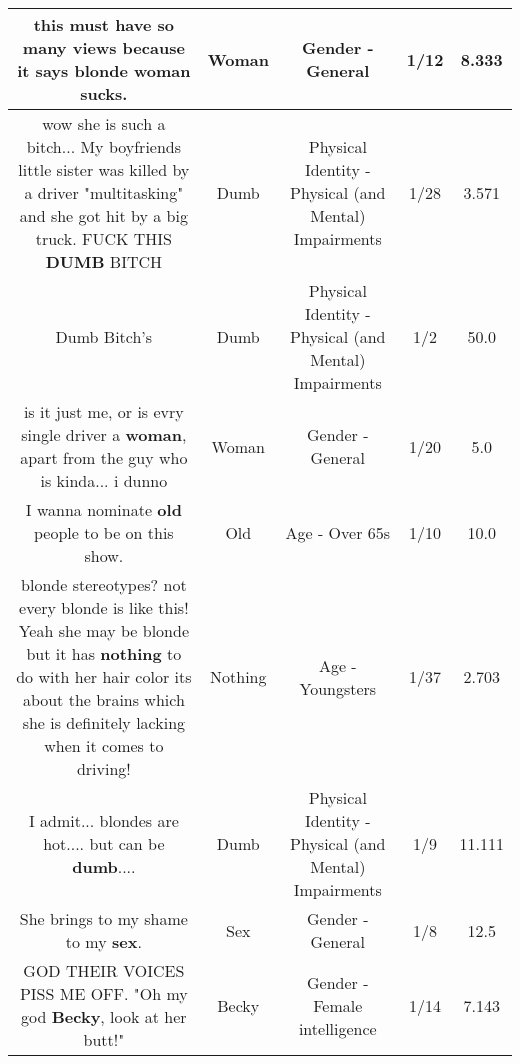 \documentclass[11pt]{article}
\newlength\mylength
\begin{document}
\begin{center}
\begin{longtable}{|C{.65\mylength}|C{.30\mylength}|C{.12\mylength}|C{.12\mylength}|C{.12\mylength}|}
  \small this must have so many views because it says blonde \textbf{woman} sucks.\normalsize   & Woman & Gender - General & 1/12 & 8.333 \\  \hline
  \small wow she is such a bitch... My boyfriends little sister was killed by a driver "multitasking" and she got hit by a big truck. FUCK THIS \textbf{DUMB} BITCH\normalsize   & Dumb & Physical Identity - Physical (and Mental) Impairments & 1/28 & 3.571 \\  \hline
  \small Dumb Bitch's\normalsize   & Dumb & Physical Identity - Physical (and Mental) Impairments & 1/2 & 50.0 \\  \hline
  \small is it just me, or is evry single driver a \textbf{woman}, apart from the guy who is kinda... i dunno\normalsize   & Woman & Gender - General & 1/20 & 5.0 \\  \hline
  \small I wanna nominate \textbf{old} people to be on this show.\normalsize   & Old & Age - Over 65s & 1/10 & 10.0 \\  \hline
  \small blonde stereotypes? not every blonde is like this!  Yeah she may be blonde but it has \textbf{nothing} to do with her hair color its about the brains which she is definitely lacking when it comes to driving!\normalsize   & Nothing & Age - Youngsters & 1/37 & 2.703 \\  \hline
  \small I admit... blondes are hot.... but can be \textbf{dumb}....\normalsize   & Dumb & Physical Identity - Physical (and Mental) Impairments & 1/9 & 11.111 \\  \hline
  \small She brings to my shame to my \textbf{sex}.\normalsize   & Sex & Gender - General & 1/8 & 12.5 \\  \hline
  \small GOD THEIR VOICES PISS ME OFF. "Oh my god \textbf{Becky}, look at her butt!"\normalsize   & Becky & Gender - Female intelligence & 1/14 & 7.143 \\  \hline

\end{longtable}
\end{center}
\end{document}
